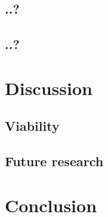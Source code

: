 \documentclass[12pt,fleqn,leqno,letterpaper]{article}
\begin{document}
\subsection{..?}
\subsection{..?}

\section{Discussion}
\subsection{Viability}
\subsection{Future research}
\section{Conclusion}






\end{document}
